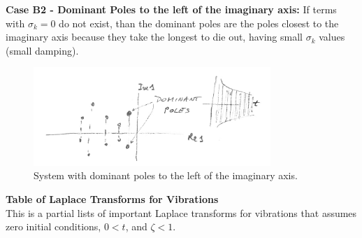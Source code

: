 \documentclass[12pt,letter]{article}
\begin{document}
\noindent \textbf{Case B2 - Dominant Poles to the left of the imaginary axis:} If terms with $\sigma_k=0$ do not exist, than the dominant poles are the poles closest to the imaginary axis because they take the longest to die out, having small $\sigma_k$ values (small damping). 

\begin{figure}[H]
	\centering
	\includegraphics[width=0.8\textwidth]{../figures/dominant_poles_B2.png}
	\caption{System with dominant poles to the left of the imaginary axis.}
\end{figure}







































\pagestyle{empty}
\vspace{-25ex}
\begin{center}
{\large{}\textbf{Table of Laplace Transforms for Vibrations}} \\
\normalsize{} This is a partial lists of important Laplace transforms for vibrations that assumes \\ zero initial conditions, $0 < t$, and $\zeta < 1$.
\end{center}
\end{document}
